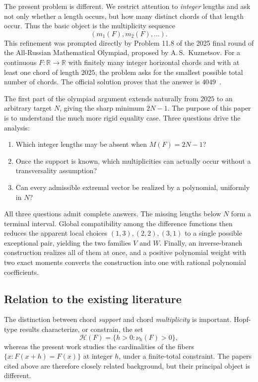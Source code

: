 \documentclass[11pt]{article}
\theoremstyle{definition}
\theoremstyle{remark}
\newcommand{\R}{\mathbb{R}}
\begin{document}
The present problem is different.  We restrict attention to \emph{integer}
lengths and ask not only whether a length occurs, but how many distinct
chords of that length occur.  Thus the basic object is the multiplicity
sequence
\[
(m_1(F),m_2(F),\ldots).
\]
This refinement was prompted directly by Problem 11.8 of the 2025 final
round of the All-Russian Mathematical Olympiad, proposed by A.\,S.~Kuznetsov.
For a continuous \(F:\R\to\R\) with finitely many integer horizontal chords
and with at least one chord of length \(2025\), the problem asks for the
smallest possible total number of chords.  The official solution proves
that the answer is \(4049\)~\cite{VSO2025}.

The first part of the olympiad argument extends naturally from \(2025\) to
an arbitrary target \(N\), giving the sharp minimum \(2N-1\).  The purpose
of this paper is to understand the much more rigid equality case.  Three
questions drive the analysis:

\begin{enumerate}[label=(\roman*)]
\item Which integer lengths may be absent when \(M(F)=2N-1\)?
\item Once the support is known, which multiplicities can actually occur
without a transversality assumption?
\item Can every admissible extremal vector be realized by a polynomial,
uniformly in \(N\)?
\end{enumerate}

All three questions admit complete answers.  The missing lengths below
\(N\) form a terminal interval.  Global compatibility among the difference
functions then reduces the apparent local choices \((1,3),(2,2),(3,1)\)
to a single possible exceptional pair, yielding the two families \(V\) and
\(W\).  Finally, an inverse-branch construction realizes all of them at
once, and a positive polynomial weight with two exact moments converts the
construction into one with rational polynomial coefficients.

\subsection{Relation to the existing literature}

The distinction between chord \emph{support} and chord \emph{multiplicity}
is important.  Hopf-type results characterize, or constrain, the set
\[
\mathcal H(F)=\{h>0:\nu_h(F)>0\},
\]
whereas the present work studies the cardinalities of the fibers
\(\{x:F(x+h)=F(x)\}\) at integer \(h\), under a finite-total constraint.
The papers cited above are therefore closely related background, but their
principal object is different.
\end{document}
